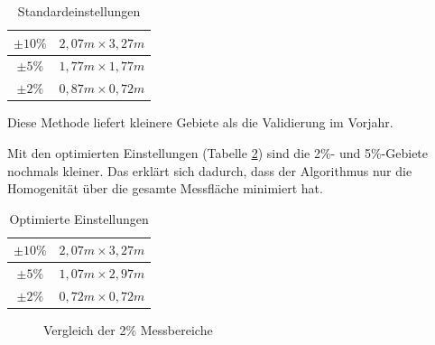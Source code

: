 \documentclass[a4paper,bibtotoc,oneside]{scrbook}
\begin{document}
\begin{table}[htbp]
\centering
\begin{tabular}{ | c | c |}\hline
$\pm 10\%$ & $2,07m \times 3,27m$  \\ \hline
$\pm 5\%$ & $1,77m \times 1,77m$    \\ \hline
$\pm 2\%$ & $0,87m \times 0,72m$     \\ \hline
\end{tabular}
\caption{Standardeinstellungen}\label{Tabstd}
\end{table}
Diese Methode liefert kleinere Gebiete als die Validierung im Vorjahr.

Mit den optimierten Einstellungen (Tabelle \ref{Tabopt}) sind die 2\%- und 5\%-Gebiete nochmals kleiner. Das erklärt sich dadurch, dass der Algorithmus nur die Homogenität über die gesamte Messfläche minimiert hat.
\begin{table}[htbp]
\centering
\begin{tabular}{ | c | c |}\hline
$\pm 10\%$ & $2,07m \times 3,27m$  \\ \hline
$\pm 5\%$ & $1,07m \times 2,97m$    \\ \hline
$\pm 2\%$ & $0,72m \times 0,72m$     \\ \hline
\end{tabular}
\caption{Optimierte Einstellungen}\label{Tabopt}
\end{table}

\FloatBarrier

\begin{figure}
\caption{Vergleich der 2\% Messbereiche}
\label{zwei}
\end{figure} 
\end{document}
